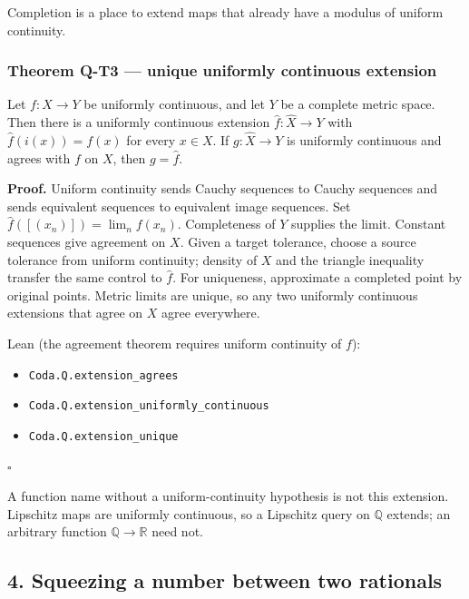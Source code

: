 \documentclass[
  11pt,
]{article}
\providecommand{\tightlist}{%
  \setlength{\itemsep}{0pt}\setlength{\parskip}{0pt}}
\begin{document}
Completion is a place to extend maps that already have a modulus of uniform continuity.

\subsubsection{Theorem Q-T3 --- unique uniformly continuous extension}\label{theorem-q-t3-unique-uniformly-continuous-extension}

Let \(f:X\to Y\) be uniformly continuous, and let \(Y\) be a complete metric space. Then there is a uniformly continuous extension \(\widehat{f}:\widehat{X}\to Y\) with \(\widehat{f}(i(x))=f(x)\) for every \(x\in X\). If \(g:\widehat{X}\to Y\) is uniformly continuous and agrees with \(f\) on \(X\), then \(g=\widehat{f}\).

\textbf{Proof.} Uniform continuity sends Cauchy sequences to Cauchy sequences and sends equivalent sequences to equivalent image sequences. Set \(\widehat{f}([(x_n)])=\lim_n f(x_n)\). Completeness of \(Y\) supplies the limit. Constant sequences give agreement on \(X\). Given a target tolerance, choose a source tolerance from uniform continuity; density of \(X\) and the triangle inequality transfer the same control to \(\widehat{f}\). For uniqueness, approximate a completed point by original points. Metric limits are unique, so any two uniformly continuous extensions that agree on \(X\) agree everywhere.

Lean (the agreement theorem requires uniform continuity of \(f\)):

\begin{itemize}
\tightlist
\item
  \nolinkurl{Coda.Q.extension_agrees}
\item
  \nolinkurl{Coda.Q.extension_uniformly_continuous}
\item
  \nolinkurl{Coda.Q.extension_unique}
\end{itemize}

\(\square\)

A function name without a uniform-continuity hypothesis is not this extension. Lipschitz maps are uniformly continuous, so a Lipschitz query on \(\mathbb{Q}\) extends; an arbitrary function \(\mathbb{Q}\to\mathbb{R}\) need not.

\subsection{4. Squeezing a number between two rationals}\label{squeezing-a-number-between-two-rationals}
\end{document}
